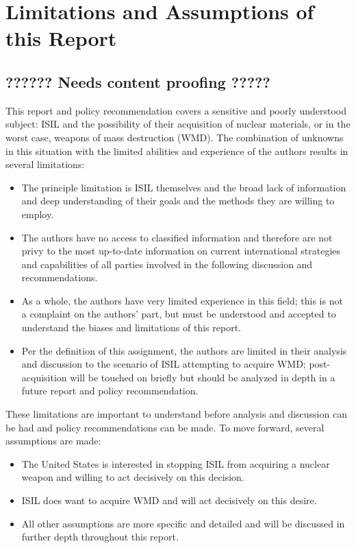 \documentclass{report}
\begin{document}
\section{Limitations and Assumptions of this Report}

\subsection{?????? Needs content proofing ?????}

This report and policy recommendation covers a sensitive and poorly understood subject: ISIL and the possibility of their acquisition of nuclear materials, or in the worst case, weapons of mass destruction (WMD). The combination of unknowns in this situation with the limited abilities and experience of the authors results in several limitations:

\begin{itemize}
  \item The principle limitation is ISIL themselves and the broad lack of information and deep understanding of their goals and the methods they are willing to employ.
  \item The authors have no access to classified information and therefore are not privy to the most up-to-date information on current international strategies and capabilities of all parties involved in the following discussion and recommendations.
  \item As a whole, the authors have very limited experience in this field; this is not a complaint on the authors' part, but must be understood and accepted to understand the biases and limitations of this report.
  \item Per the definition of this assignment, the authors are limited in their analysis and discussion to the scenario of ISIL attempting to acquire WMD; post-acquisition will be touched on briefly but should be analyzed in depth in a future report and policy recommendation.
\end{itemize}


These limitations are important to understand before analysis and discussion can be had and policy recommendations can be made. To move forward, several assumptions are made:

\begin{itemize}
  \item The United States is interested in stopping ISIL from acquiring a nuclear weapon and willing to act decisively on this decision.
  \item ISIL does want to acquire WMD and will act decisively on this desire.
  \item All other assumptions are more specific and detailed and will be discussed in further depth throughout this report.
\end{itemize}
\end{document}
